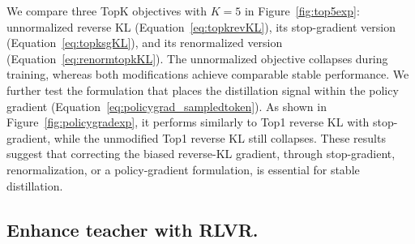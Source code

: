 We compare three TopK objectives with $K=5$ in
Figure~\ref{fig:top5exp}: unnormalized reverse KL
(Equation~\ref{eq:topkrevKL}), its stop-gradient version
(Equation~\ref{eq:topksgKL}), and its renormalized version
(Equation~\ref{eq:renormtopkKL}). The unnormalized objective collapses during
training, whereas both modifications achieve comparable stable performance. We further test the formulation that places the distillation
signal within the policy gradient
(Equation~\ref{eq:policygrad_sampledtoken}). As shown in
Figure~\ref{fig:policygradexp}, it performs similarly to Top1 reverse KL with
stop-gradient, while the unmodified Top1 reverse KL still collapses. These
results suggest that correcting the biased reverse-KL gradient, through
stop-gradient, renormalization, or a policy-gradient formulation, is essential
for stable distillation.





\subsection{Enhance teacher with RLVR.}

